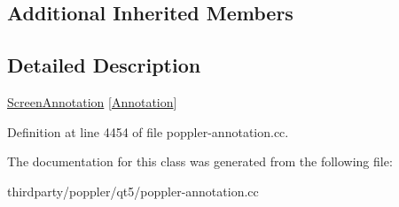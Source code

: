 \subsection*{Additional Inherited Members}


\subsection{Detailed Description}
\hyperlink{class_poppler_1_1_screen_annotation}{Screen\+Annotation} \mbox{[}\hyperlink{class_poppler_1_1_annotation}{Annotation}\mbox{]} 

Definition at line 4454 of file poppler-\/annotation.\+cc.



The documentation for this class was generated from the following file\+:\begin{DoxyCompactItemize}
\item 
thirdparty/poppler/qt5/poppler-\/annotation.\+cc\end{DoxyCompactItemize}
